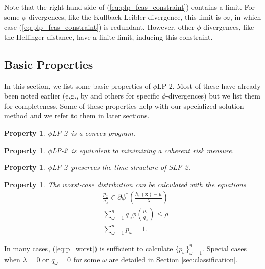 \documentclass[ijoc,letterpaper]{informs3} %
\newcommand{\x}{\mathbf{x}}
\newtheorem{property}[theorem]{Property}
\newcommand{\plp}{$\phi$LP-2}
\begin{document}
Note that the right-hand side of (\ref{eq:plp_feas_constraint}) contains a limit.
For some $\phi$-divergences, like the Kullback-Leibler divergence, this limit is $\infty$, in which case (\ref{eq:plp_feas_constraint}) is redundant.
However, other $\phi$-divergences, like the Hellinger distance, have a finite limit, inducing this constraint.


\subsection{Basic Properties}
\label{ssec:basicprop}

In this section, we list some basic properties of \plp.
Most of these have already been noted earlier (e.g., by \cite{bental2011robust} and others for specific $\phi$-divergences) but we list them for completeness.
Some of these properties help with our specialized solution method and we refer to them in later sections.

\begin{property}
	\label{property:convex}
	\plp\ is a convex program.
\end{property}

\begin{property}
	\label{property:coherent_risk_measure}
	\plp\ is equivalent to minimizing a coherent risk measure.
\end{property}

\begin{property}
	\label{property:time_structure}
	\plp\ preserves the time structure of SLP-2.
\end{property}

\begin{property}
	\label{property:primal_dual_relation}
	The worst-case distribution can be calculated with the equations
	\begin{align} 
		& \frac{p_\omega}{q_\omega} \in \partial \phi^*\left(\frac{h_\omega(\x)-\mu}{\lambda}\right) \label{eq:p_worst} \\
		& \sum_{\omega=1}^n q_\omega \phi\left(\frac{p_\omega}{q_\omega}\right) \leq \rho \nonumber \\
		& \sum_{\omega=1}^n p_\omega = 1. \nonumber
	\end{align}
\end{property}
In many cases, (\ref{eq:p_worst}) is sufficient to calculate $\{p_\omega\}_{\omega=1}^n$.
Special cases when $\lambda = 0$ or $q_\omega = 0$ for some $\omega$ are detailed in Section \ref{sec:classification}.
\end{document}
